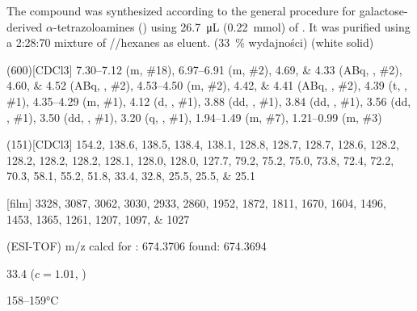 The compound was synthesized according to the general procedure for galactose-derived $\alpha$-tetrazoloamines () using \SI{26.7}{\micro\liter} (\SI{0.22}{\milli\mol}) of .
It was purified using a 2:28:70 mixture of //hexanes as eluent.
(\SI{33}{\percent} wydajności) (white solid)
\begin{fullexp}
	\NMR(600)[CDCl3] \numrange{7.30}{7.12} (m, \#{18}), \numrange{6.97}{6.91} (m, \#{2}), \numlist{4.69;4.33} (ABq, , \#{2}), \numlist{4.60;4.52} (ABq, , \#{2}), \numrange{4.53}{4.50} (m, \#{2}), \numlist{4.42;4.41} (ABq, , \#{2}), \num{4.39} (t, , \#{1}), \numrange{4.35}{4.29} (m, \#{1}), \num{4.12} (d, , \#{1}), \num{3.88} (dd, , \#{1}), \num{3.84} (dd, , \#{1}), \num{3.56} (dd, , \#{1}), \num{3.50} (dd, , \#{1}), \num{3.20} (q, , \#{1}), \numrange{1.94}{1.49} (m, \#{7}), \numrange{1.21}{0.99} (m, \#{3})\par\noindent
	(151)[CDCl3] \numlist{154.2; 138.6; 138.5; 138.4; 138.1; 128.8; 128.7; 128.7; 128.6; 128.2; 128.2; 128.2; 128.2; 128.1; 128.0; 128.0; 127.7; 79.2; 75.2; 75.0; 73.8; 72.4; 72.2; 70.3; 58.1; 55.2; 51.8; 33.4; 32.8; 25.5; 25.5; 25.1}\par\noindent
	[film] \numlist{3328; 3087; 3062; 3030; 2933; 2860; 1952; 1872; 1811; 1670; 1604; 1496; 1453; 1365; 1261; 1207; 1097; 1027}\par\noindent
	 (ESI-TOF) m/z calcd for : \num{674.3706} found: \num{674.3694}\par\noindent
	\data{[$\alpha^{23}_D$]~$=$} \num{33.4} ($c = 1.01$, )\par\noindent
	 \numrange{158}{159}\si{\celsius}
\end{fullexp}

